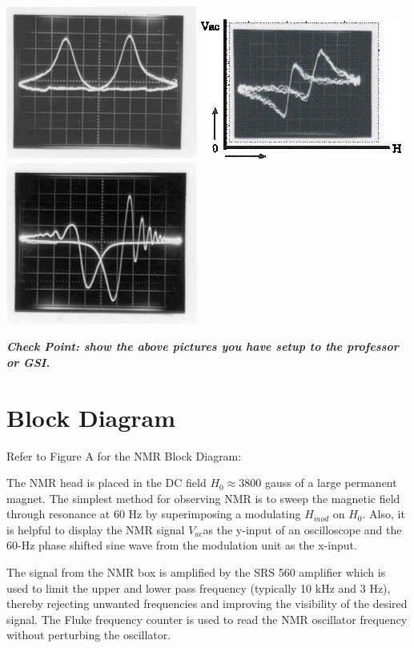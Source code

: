 \documentclass{../lab}
\begin{document}
\noindent
\href{http://experimentationlab.berkeley.edu/sites/default/files/images/NMR17.gif}{\includegraphics[width=0.33\linewidth,keepaspectratio]{images/NMR17.png}}
\href{http://experimentationlab.berkeley.edu/sites/default/files/images/250px-NMR18.gif}{\includegraphics[width=0.33\linewidth,keepaspectratio]{images/250px-NMR18.png}}
\href{http://experimentationlab.berkeley.edu/sites/default/files/images/NMR19.gif}{\includegraphics[width=0.33\linewidth,keepaspectratio]{images/NMR19.png}}

\emph{\textbf{Check Point: show the above pictures you have setup to  the professor or GSI.}}

\section{Block Diagram}

Refer to Figure A for the NMR Block Diagram:

The NMR head is placed in the DC field $ H_0 \approx 3800 $ gauss of a large permanent magnet. The simplest method for observing NMR is to sweep the magnetic field through resonance at 60 Hz by superimposing a modulating $H_{mod}$ on $H_0$. Also, it is helpful to display the NMR signal $V_{ac}$as the y-input of an oscilloscope and the 60-Hz phase shifted sine wave from the modulation unit as the x-input.

The signal from the NMR box is amplified by the SRS 560 amplifier which is used to limit the upper and lower pass frequency (typically 10 kHz and 3 Hz), thereby rejecting unwanted frequencies and improving the visibility of the desired signal. The Fluke frequency counter is used to read the NMR oscillator frequency without perturbing the oscillator.
\end{document}
